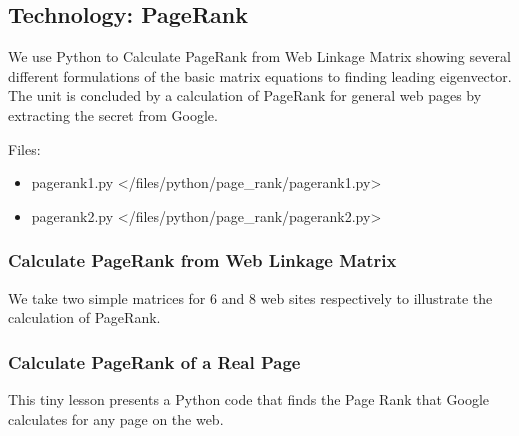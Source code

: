\subsection{Technology: PageRank}\label{technology-pagerank}

We use Python to Calculate PageRank from Web Linkage Matrix showing
several different formulations of the basic matrix equations to finding
leading eigenvector. The unit is concluded by a calculation of PageRank
for general web pages by extracting the secret from Google.

Files:

\begin{itemize}

\item
  pagerank1.py \textless{}/files/python/page\_rank/pagerank1.py\textgreater{}
\item
  pagerank2.py \textless{}/files/python/page\_rank/pagerank2.py\textgreater{}
\end{itemize}

\subsubsection{Calculate PageRank from Web Linkage
Matrix}\label{calculate-pagerank-from-web-linkage-matrix}

We take two simple matrices for 6 and 8 web sites respectively to
illustrate the calculation of PageRank.

\subsubsection{Calculate PageRank of a Real
Page}\label{calculate-pagerank-of-a-real-page}

This tiny lesson presents a Python code that finds the Page Rank that
Google calculates for any page on the web.
